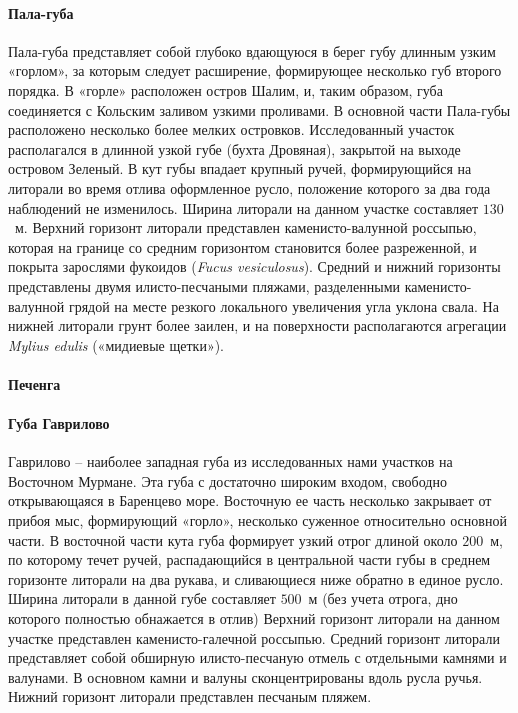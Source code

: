     \paragraph{Пала-губа}
Пала-губа   представляет   собой   глубоко   вдающуюся   в   берег   губу   длинным   узким «горлом», за которым следует расширение, формирующее несколько губ второго порядка. 
В «горле» расположен остров Шалим, и, таким образом, губа соединяется с Кольским заливом узкими   проливами.   
В   основной   части   Пала-губы   расположено   несколько   более   мелких островков. 
Исследованный участок располагался в длинной узкой губе (бухта Дровяная), закрытой на выходе островом Зеленый.
В кут губы впадает крупный ручей, формирующийся на литорали во время отлива оформленное русло, положение которого за два года наблюдений не изменилось.
Ширина литорали на данном участке составляет  $130$~м. 
Верхний горизонт литорали представлен   каменисто-валунной   россыпью,   которая   на   границе   со   средним   горизонтом становится более разреженной, и покрыта зарослями фукоидов ({\it Fucus vesiculosus}). 
Средний и нижний   горизонты   представлены   двумя   илисто-песчаными   пляжами,   разделенными каменисто-валунной грядой на месте резкого локального увеличения угла уклона свала. 
На нижней литорали грунт более заилен, и на поверхности располагаются агрегации {\it Mylius edulis} («мидиевые щетки»).

    \paragraph{Печенга}

    \paragraph{Губа Гаврилово}
Гаврилово – наиболее западная губа из исследованных нами участков на Восточном Мурмане. 
Эта   губа   с  достаточно   широким   входом,   свободно   открывающаяся  в  Баренцево море.   
Восточную   ее   часть   несколько   закрывает   от   прибоя   мыс,   формирующий   «горло», несколько суженное относительно основной части. 
В восточной части кута губа формирует узкий отрог длиной   около $200$~м, по которому течет ручей, распадающийся в центральной части   губы  в  среднем   горизонте   литорали   на   два   рукава,   и   сливающиеся   ниже   обратно   в единое русло.
Ширина литорали  в  данной губе составляет  $500$~м  (без  учета отрога, дно которого полностью обнажается в отлив) Верхний горизонт литорали на данном участке представлен каменисто-галечной   россыпью.   
Средний   горизонт   литорали   представляет   собой   обширную илисто-песчаную   отмель   с   отдельными   камнями   и   валунами.  
В   основном   камни   и   валуны сконцентрированы   вдоль   русла   ручья.   
Нижний   горизонт   литорали   представлен   песчаным пляжем. 

